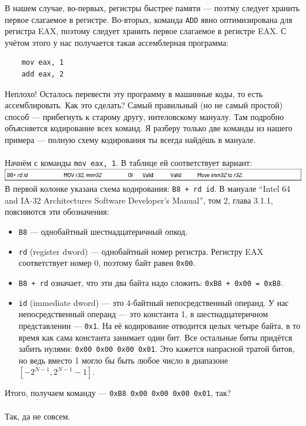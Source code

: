 \documentclass[11pt]{book}
\begin{document}
В нашем случае, во-первых, регистры быстрее памяти --- поэтму следует хранить первое слагаемое в регистре.
Во-вторых, команда \texttt{ADD} явно оптимизирована для регистра EAX, поэтому следует хранить первое слагаемое в регистре EAX.
С учётом этого у нас получается такая ассемблерная программа:
\begin{verbatim}
    mov eax, 1
    add eax, 2
\end{verbatim}
Неплохо! Осталось перевести эту программу в машинные коды, то есть ассемблировать.
Как это сделать?
Самый правильный (но не самый простой) способ --- прибегнуть к старому другу, интеловскому мануалу.
Там подробно объясняется кодирование всех команд.
Я разберу только две команды из нашего примера --- полную схему кодирования ты всегда найдёшь в мануале.
\\ \\
Начнём с команды \texttt{mov eax, 1}.
В таблице ей соответствует вариант:
\\
\includegraphics[width=6.5in]{pic/mov_r32_imm32.png}
\\
В первой колонке указана схема кодирования: \texttt{B8 + rd id}.
В мануале ``Intel 64 and IA-32 Architectures Software Developer's Manual'', том 2, глава 3.1.1, поясняются эти обозначения:
\begin{itemize}
\item \texttt{B8} --- однобайтный шестнадцатеричный опкод.
\item \texttt{rd} (register dword) --- однобайтный номер регистра.
Регистру EAX соответствует номер 0, поэтому байт равен \texttt{0x00}.
\item \texttt{B8 + rd} означает, что эти два байта надо сложить: \texttt{0xB8 + 0x00 = 0xB8}.
\item \texttt{id} (immediate dword) --- это 4-байтный непосредственный операнд.
У нас непосредственный операнд --- это константа 1, в шестнадцатеричном представлении --- \texttt{0x1}.
На её кодирование отводится целых четыре байта, в то время как сама константа занимает один бит.
Все остальные биты придётся забить нулями: \texttt{0x00 0x00 0x00 0x01}.
Это кажется напрасной тратой битов, но ведь вместо 1 могло бы быть любое число в диапазоне $[-2^{N - 1}, 2^{N - 1} - 1]$.
\end{itemize}
Итого, получаем команду --- \texttt{0xB8 0x00 0x00 0x00 0x01}, так?
\\ \\
Так, да не совсем.
\end{document}
